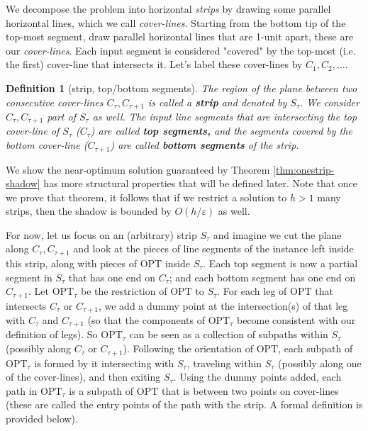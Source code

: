 \documentclass[10pt,a4paper]{amsart}
\theoremstyle{thmstyleone}
\newtheorem{definition}{Definition} %
\newcommand{\eps}{\varepsilon}
\newcommand{\OPT}{{\text{OPT}}}
\begin{document}
\label{sec:bounded-shadow}
We decompose the problem into horizontal {\em strips} by drawing some parallel horizontal lines, which we call {\em cover-lines}.
Starting from the bottom tip of the top-most segment, draw parallel horizontal lines that are 1-unit apart, these are our {\em cover-lines}. Each input segment is considered "covered" by the top-most (i.e. the first) cover-line that intersects it. Let's label these cover-lines by $C_1,C_2,\ldots$.


\begin{definition}[strip, top/bottom segments]\label{def:strip/top-bottom}
	The region of the plane between two consecutive cover-lines $C_\tau,C_{\tau+1}$ is called a \textbf{strip} and denoted by $S_\tau$. 
	We consider $C_\tau,C_{\tau+1}$ part of $S_\tau$ as well.
	The input line segments that are intersecting the top cover-line of $S_\tau$ ($C_\tau$) are called \textbf{top segments,} and the segments covered by the bottom cover-line ($C_{\tau + 1}$) are called \textbf{bottom segments} of the strip.  
\end{definition}

We show the near-optimum solution guaranteed by Theorem \ref{thm:onestrip-shadow} has more structural properties that will be defined later. Note that once we prove that theorem, it follows that if we restrict a solution to $h>1$ many strips, then the shadow is bounded by $O(h/\eps)$ as well.

For now, let us focus on an (arbitrary) strip $S_\tau$ and imagine we cut the plane along $C_\tau,C_{\tau+1}$ and look at the pieces of line segments of the instance left inside this strip, along with pieces of $\OPT$ inside $S_\tau$. 
Each top segment is now a partial segment in $S_\tau$ that has one end on $C_\tau$; and each bottom segment has one end on $C_{\tau+1}$.
Let $\OPT_\tau$ be the restriction of $\OPT$ to $S_\tau$. 
For each leg of $\OPT$ that intersects $C_\tau$ or $C_{\tau+1}$, we add a dummy point at the intersection(s) of that leg with $C_\tau$ and $C_{\tau+1}$ (so that the components of $ \OPT_\tau $ become consistent with our definition of legs).
So $\OPT_\tau$ can be seen as a collection of subpaths within $S_\tau$ (possibly along $C_\tau$ or $C_{\tau+1}$). Following the orientation of $\OPT$, each subpath of $\OPT_\tau$ is formed by it intersecting with $S_\tau$, traveling within $S_\tau$ (possibly along one of the cover-lines), and then exiting $S_\tau$. Using the dummy points added, each path in $\OPT_\tau$ is a subpath of $\OPT$ that is between two points on cover-lines (these are called the entry points of the path with the strip. A formal definition is provided below).
\end{document}
